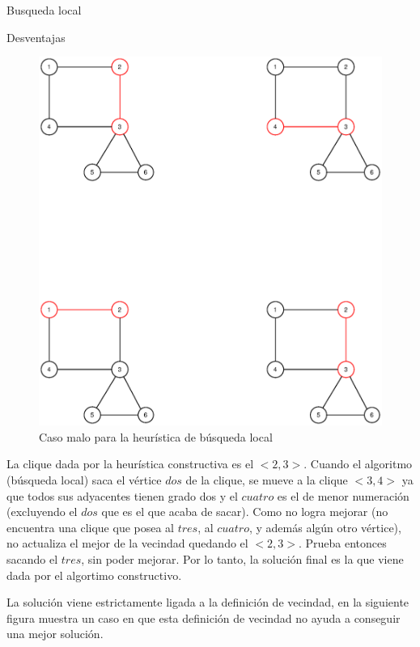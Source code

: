 \begin{section}{Busqueda local}
\begin{subsection}{Desventajas}
			\begin{figure}[H]
				\centering
		    	\includegraphics[scale=0.5]{busqueda_local/segCasoMalo.eps}
			    \caption{Caso malo para la heurística de búsqueda local}
			    \label{fig:seguimiento_caso_malo_busqueda_local}
			\end{figure}


		La clique dada por la heurística constructiva es el $<2,3>$.
		Cuando el algoritmo (búsqueda local) saca el vértice $dos$ de la clique, se mueve a la clique $<3,4>$ ya que todos sus adyacentes tienen grado dos y el $cuatro$ es el de menor numeración (excluyendo el $dos$ que es el que acaba de sacar). Como no logra mejorar (no encuentra una clique que posea al $tres$, al $cuatro$, y además algún otro vértice), no actualiza el mejor de la vecindad quedando el $<2,3>$. Prueba entonces sacando el $tres$, sin poder mejorar. Por lo tanto, la solución final es la que viene dada por el algortimo constructivo.
	
		\VSP
		La solución viene estrictamente ligada a la definición de vecindad, en la siguiente figura muestra un caso en que esta definición de vecindad no ayuda a conseguir una mejor solución.


\end{subsection}
\end{section}
